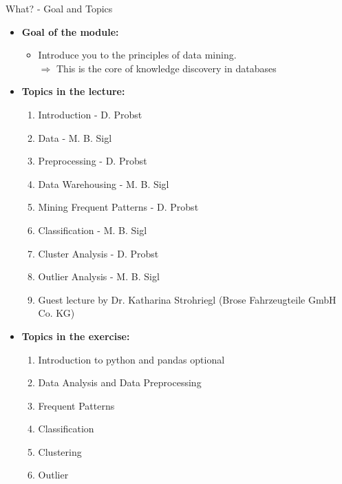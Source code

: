 \begin{frame}{What? - Goal and Topics}
	\begin{itemize}
		\item \textbf{Goal of the module:}
		      \begin{itemize}
			      \item Introduce you to the principles of data mining. \\
			            $\Rightarrow$ This is the core of knowledge discovery in databases
		      \end{itemize}
		\item \textbf{Topics in the lecture:}
		      \vspace*{-1\multicolsep}
		      \begin{multicols}{2}
			      \begin{enumerate}
				      \item Introduction {\color{gray} - D. Probst}
				      \item Data {\color{gray} - M. B. Sigl}
				      \item Preprocessing {\color{gray} - D. Probst}
				      \item Data Warehousing {\color{gray} - M. B. Sigl}
				      \item Mining Frequent Patterns {\color{gray} - D. Probst}
				      \item Classification {\color{gray} - M. B. Sigl}
				      \item Cluster Analysis {\color{gray} - D. Probst}
				      \item Outlier Analysis {\color{gray} - M. B. Sigl}
				      \item {\color{gray}Guest lecture by Dr. Katharina Strohriegl (Brose Fahrzeugteile GmbH Co. KG)}
			      \end{enumerate}
		      \end{multicols}
		      \vspace*{-1\multicolsep}
		\item \textbf{Topics in the exercise:}
		      \vspace*{-1\multicolsep}
		      \begin{multicols}{2}
			      \begin{enumerate}
				      \item Introduction to python and pandas {\color{gray}optional}
				      \item Data Analysis and Data Preprocessing
				      \item Frequent Patterns
				      \item Classification
				      \item Clustering
				      \item Outlier
			      \end{enumerate}
		      \end{multicols}
		      \
	\end{itemize}
\end{frame}

